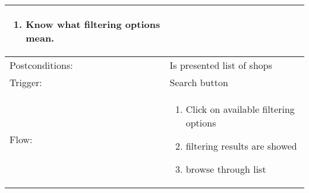 \begin{longtable}{| p{3.5cm} | p{9cm} |}
\begin{enumerate}
\item Know what filtering options mean.
\end{enumerate}\\
\hline
Postconditions: & Is presented list of shops\\
\hline
Trigger: & Search button\\
\hline
Flow: &\mbox{}\par\vspace{-\baselineskip}
\begin{enumerate}
\item Click on available filtering options
\item filtering results are showed 
\item browse through list
\end{enumerate}\\
\hline
\end{longtable}

